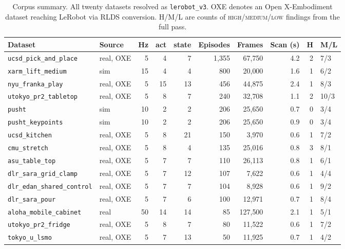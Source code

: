 \documentclass[10pt,a4paper]{article}
\newcommand{\dtr}[1]{\texttt{\small #1}}
\begin{document}
\begin{table}[tb]
\centering
\caption{Corpus summary. All twenty datasets resolved as \texttt{lerobot\_v3}. OXE denotes
an Open X-Embodiment dataset reaching LeRobot via RLDS conversion. H/M/L are counts of
\textsc{high}/\textsc{medium}/\textsc{low} findings from the full pass.}
\label{tab:corpus}
\footnotesize
\begin{tabular}{llrrrrrrrl}
\toprule
Dataset & Source & Hz & act & state & Episodes & Frames & Scan (s) & H & M/L \\
\midrule
\dtr{ucsd\_pick\_and\_place}      & real, OXE &  5 &  4 &  7 & 1{,}355 & 67{,}750  & 4.2 & 2 & 7/3 \\
\dtr{xarm\_lift\_medium}                & sim  & 15 &  4 &  4 &    800  & 20{,}000  & 1.6 & 1 & 6/2 \\
\dtr{nyu\_franka\_play}           & real, OXE &  5 & 15 & 13 &    456  & 44{,}875  & 2.4 & 1 & 8/3 \\
\dtr{utokyo\_pr2\_tabletop}       & real, OXE &  5 &  8 &  7 &    240  & 32{,}708  & 1.1 & 2 & 10/3 \\
\dtr{pusht}                             & sim  & 10 &  2 &  2 &    206  & 25{,}650  & 0.7 & 0 & 3/4 \\
\dtr{pusht\_keypoints}                  & sim  & 10 &  2 &  2 &    206  & 25{,}650  & 0.9 & 0 & 3/4 \\
\dtr{ucsd\_kitchen}               & real, OXE &  5 &  8 & 21 &    150  & 3{,}970   & 0.6 & 1 & 7/2 \\
\dtr{cmu\_stretch}                & real, OXE &  5 &  8 &  4 &    135  & 25{,}016  & 0.8 & 3 & 8/1 \\
\dtr{asu\_table\_top}             & real, OXE &  5 &  7 &  7 &    110  & 26{,}113  & 0.8 & 1 & 6/1 \\
\dtr{dlr\_sara\_grid\_clamp}      & real, OXE &  5 &  7 & 12 &    107  & 7{,}622   & 0.6 & 1 & 4/4 \\
\dtr{dlr\_edan\_shared\_control}  & real, OXE &  5 &  7 &  7 &    104  & 8{,}928   & 0.6 & 1 & 9/2 \\
\dtr{dlr\_sara\_pour}             & real, OXE &  5 &  7 &  6 &    100  & 12{,}971  & 0.7 & 1 & 8/4 \\
\dtr{aloha\_mobile\_cabinet}            & real & 50 & 14 & 14 &     85  & 127{,}500 & 2.1 & 1 & 5/1 \\
\dtr{utokyo\_pr2\_fridge}         & real, OXE &  5 &  8 &  7 &     80  & 11{,}522  & 0.6 & 1 & 7/2 \\
\dtr{tokyo\_u\_lsmo}              & real, OXE &  5 &  7 & 13 &     50  & 11{,}925  & 0.7 & 1 & 4/2 \\

\end{tabular}
\end{table}
\end{document}
